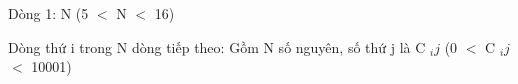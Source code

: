 Dòng 1: N (5 $<$ N $<$ 16)  

   Dòng thứ i trong N dòng tiếp theo: Gồm N số nguyên, số thứ j là C   $_    ij   $   (0 $<$ C   $_    ij   $   $<$ 10001)